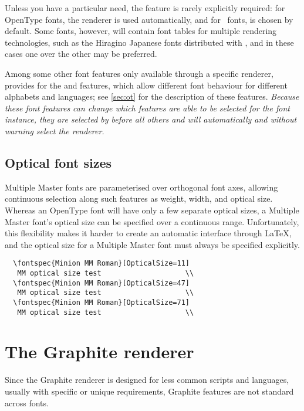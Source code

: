 \documentclass[a4paper]{l3doc}
\begin{document}
Unless you have a particular need, the  feature is rarely explicitly required: for OpenType
fonts, the  renderer is used automatically, and for \AAT\ fonts,
 is chosen by default. Some fonts, however, will contain font tables
for multiple rendering technologies, such as the Hiragino Japanese fonts
distributed with \MacOSX, and in these cases one over the other may be preferred.

Among some other font features only available through a specific renderer,
 provides for the  and  features, which allow
different font behaviour for different alphabets and languages; see \vref{sec:ot}
for the description of these features. {\em Because these font features can
change which features are able to be selected for the font instance, they are selected
by  before all others and will automatically and without warning
select the  renderer.}


\subsection{Optical font sizes} \label{sec:aat-opticalsize}

Multiple Master fonts are parameterised over
orthogonal font axes, allowing continuous selection along such
features as weight, width, and optical size.
Whereas an OpenType font will have only a few separate
optical sizes, a Multiple Master font's optical size can be
specified over a continuous range. Unfortunately, this flexibility makes
it harder to create an automatic interface through \LaTeX, and the
optical size for a Multiple Master font must always be specified
explicitly.
\begin{Verbatim}
  \fontspec{Minion MM Roman}[OpticalSize=11]
   MM optical size test                    \\
  \fontspec{Minion MM Roman}[OpticalSize=47]
   MM optical size test                    \\
  \fontspec{Minion MM Roman}[OpticalSize=71]
   MM optical size test                    \\
\end{Verbatim}


\section{The Graphite renderer}
\label{sec:graphite-features}

Since the Graphite renderer is designed for less common scripts and languages, usually with
specific or unique requirements, Graphite features are not standard across fonts.
\end{document}
